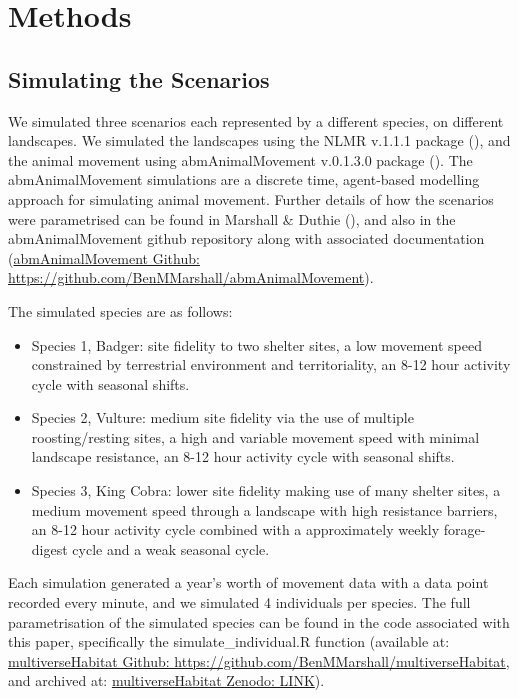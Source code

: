 \documentclass[10pt,a4paper]{article}
\begin{document}
\section{Methods}\label{methods}

\subsection{Simulating the Scenarios}\label{simulating-the-scenarios}

We simulated three scenarios each represented by a different species, on different landscapes.
We simulated the landscapes using the NLMR v.1.1.1 package (), and the animal movement using abmAnimalMovement v.0.1.3.0 package ().
The abmAnimalMovement simulations are a discrete time, agent-based modelling approach for simulating animal movement.
Further details of how the scenarios were parametrised can be found in Marshall \& Duthie (), and also in the abmAnimalMovement github repository along with associated documentation (\href{https://github.com/BenMMarshall/abmAnimalMovement/tree/main/notebook/manuscript}{abmAnimalMovement Github: https://github.com/BenMMarshall/abmAnimalMovement}).

The simulated species are as follows:

\begin{itemize}
\item
  Species 1, Badger: site fidelity to two shelter sites, a low movement speed constrained by terrestrial environment and territoriality, an 8-12 hour activity cycle with seasonal shifts.
\item
  Species 2, Vulture: medium site fidelity via the use of multiple roosting/resting sites, a high and variable movement speed with minimal landscape resistance, an 8-12 hour activity cycle with seasonal shifts.
\item
  Species 3, King Cobra: lower site fidelity making use of many shelter sites, a medium movement speed through a landscape with high resistance barriers, an 8-12 hour activity cycle combined with a approximately weekly forage-digest cycle and a weak seasonal cycle.
\end{itemize}

Each simulation generated a year's worth of movement data with a data point recorded every minute, and we simulated 4 individuals per species.
The full parametrisation of the simulated species can be found in the code associated with this paper, specifically the simulate\_individual.R function (available at: \href{https://github.com/BenMMarshall/multiverseHabitat}{multiverseHabitat Github: https://github.com/BenMMarshall/multiverseHabitat}, and archived at: \href{https://LINK}{multiverseHabitat Zenodo: LINK}).
\end{document}

